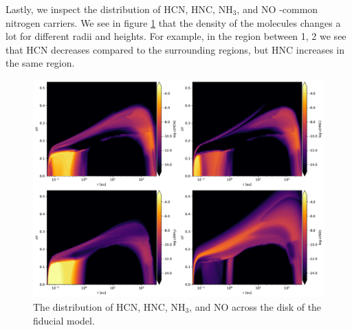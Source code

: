 \documentclass[twoside, single, authoryear, semicolon]{lion-msc}
\newcommand{\3}{$_3$}
\newcommand{\2}{$_2$}
\begin{document}
Lastly, we inspect the distribution of HCN, HNC, NH\3, and NO -common nitrogen carriers. We see in figure \ref{fig:nitrogen distribution} that the density of the molecules changes a lot for different radii and heights. For example, in the region between 1, 2 we see that HCN decreases compared to the surrounding regions, but HNC increases in the same region. 

\begin{figure}[!ht]
    \centering
    \includegraphics[width=\linewidth]{Figures/Abundance.pdf}
    \caption{The distribution of HCN, HNC, NH\3, and NO across the disk of the fiducial model.}
    \label{fig:nitrogen distribution}
\end{figure}
\end{document}
